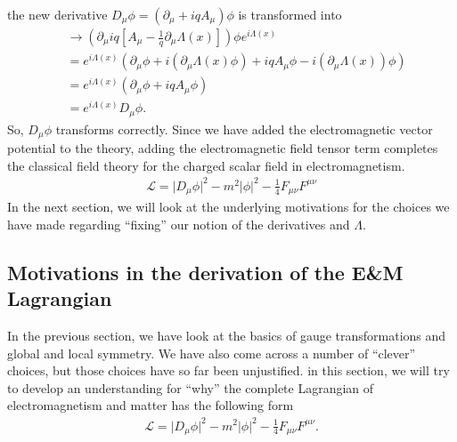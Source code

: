 \documentclass{book}
\numberwithin{equation}{section}
\theoremstyle{definition}
\newcommand{\p}{\partial}
\newcommand{\lag}{\mathcal{L}}
\begin{document}
the new derivative $D_\mu\phi = (\p_\mu + iqA_\mu)\phi$ is transformed into
\begin{align}
&\to \left( \p_\mu  iq\left[ A_\mu -\frac{1}{q}\p_\mu\Lambda(x)  \right] \right)\phi e^{i\Lambda(x)}\\
&= e^{i\Lambda(x)}\left( \p_\mu\phi + i(\p_\mu\Lambda(x)\phi) + iqA_\mu \phi - i(\p_\mu \Lambda(x))\phi \right)\\
&= e^{i\Lambda(x)}(\p_\mu \phi + iqA_\mu\phi)\\
&= e^{i\Lambda(x)}D_\mu\phi.
\end{align}
So, $D_\mu\phi$ transforms correctly. Since we have added the electromagnetic vector potential to the theory, adding the electromagnetic field tensor term completes the classical field theory for the charged scalar field in electromagnetism. 
\begin{align}
\boxed{\lag = \vert D_\mu \phi\vert^2 - m^2\vert \phi\vert^2 - \frac{1}{4}F_{\mu\nu}F^{\mu\nu} }
\end{align}
In the next section, we will look at the underlying motivations for the choices we have made regarding ``fixing'' our notion of the derivatives and $\Lambda$.


\subsection{Motivations in the derivation of the E\&M Lagrangian}
In the previous section, we have look at the basics of gauge transformations and global and local symmetry. We have also come across a number of ``clever'' choices, but those choices have so far been unjustified. in this section, we will try to develop an understanding for ``why'' the complete Lagrangian of electromagnetism and matter has the following form
\begin{align}
\lag = \vert D_\mu \phi\vert^2 - m^2\vert \phi\vert^2 - \frac{1}{4}F_{\mu\nu}F^{\mu\nu} .
\end{align} 
\end{document}

